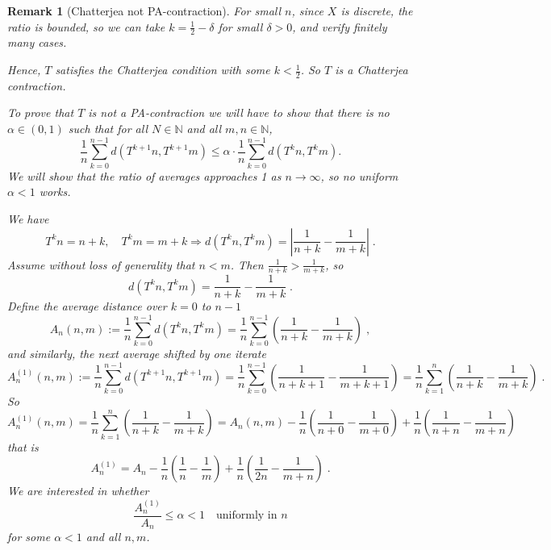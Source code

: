\documentclass[11pt]{article}
\newtheorem{remark}[theorem]{Remark}
\begin{document}
\begin{remark}[Chatterjea not PA-contraction]
For small $ n $, since $ X $ is discrete, the ratio is bounded, so we can take $ k = \frac{1}{2} - \delta $ for small $ \delta > 0 $, and verify finitely many cases.

Hence, $ T $ satisfies the Chatterjea condition with some $ k < \frac{1}{2} $.
So $ T $ is a Chatterjea contraction.

To prove that $T$ is not a PA-contraction
we will have to show that there is no $ \alpha \in (0,1) $ such that for all $ N \in \mathbb{N} $ and all $ m, n \in \mathbb{N} $,
\begin{equation}
  \frac{1}{n} \sum_{k=0}^{n-1} d(T^{k+1}n, T^{k+1}m) \leq \alpha \cdot \frac{1}{n} \sum_{k=0}^{n-1} d(T^k n, T^k m).
\end{equation}
We will show that the ratio of averages approaches 1 as $ n \to \infty $, so no uniform $ \alpha < 1 $ works.

We have
\begin{equation}
T^k n = n + k, \quad T^k m = m + k
\Rightarrow
d(T^k n, T^k m) = \left| \frac{1}{n+k} - \frac{1}{m+k} \right| \; .
\end{equation}
Assume without loss of generality that $ n < m $. Then $ \frac{1}{n+k} > \frac{1}{m+k} $, so
\begin{equation}
d(T^k n, T^k m) = \frac{1}{n+k} - \frac{1}{m+k} \; .
\end{equation}
Define the average distance over $ k = 0 $ to $ n-1 $
\begin{equation}
A_n(n,m) := \frac{1}{n} \sum_{k=0}^{n-1} d(T^k n, T^k m) = \frac{1}{n} \sum_{k=0}^{n-1} \left( \frac{1}{n+k} - \frac{1}{m+k} \right) \; ,
\end{equation}
and similarly, the next average shifted by one iterate
\begin{equation}
A_n^{(1)}(n,m) := \frac{1}{n} \sum_{k=0}^{n-1} d(T^{k+1}n, T^{k+1}m) = \frac{1}{n} \sum_{k=0}^{n-1} \left( \frac{1}{n+k+1} - \frac{1}{m+k+1} \right)
= \frac{1}{n} \sum_{k=1}^{n} \left( \frac{1}{n+k} - \frac{1}{m+k} \right) \; .
\end{equation}
So
\begin{equation}
A_n^{(1)}(n,m) = \frac{1}{n} \sum_{k=1}^{n} \left( \frac{1}{n+k} - \frac{1}{m+k} \right)
= A_n(n,m) - \frac{1}{n} \left( \frac{1}{n+0} - \frac{1}{m+0} \right) + \frac{1}{n} \left( \frac{1}{n+n} - \frac{1}{m+n} \right) \; 
\end{equation}
that is
\begin{equation}
A_n^{(1)} = A_n - \frac{1}{n} \left( \frac{1}{n} - \frac{1}{m} \right) + \frac{1}{n} \left( \frac{1}{2n} - \frac{1}{m+n} \right) \; .
\end{equation}
We are interested in whether
\begin{equation}
\frac{A_n^{(1)}}{A_n} \leq \alpha < 1 \quad \text{uniformly in } n
\end{equation}
for some  $\alpha < 1$  and all  $n, m$.



\end{remark}
\end{document}

